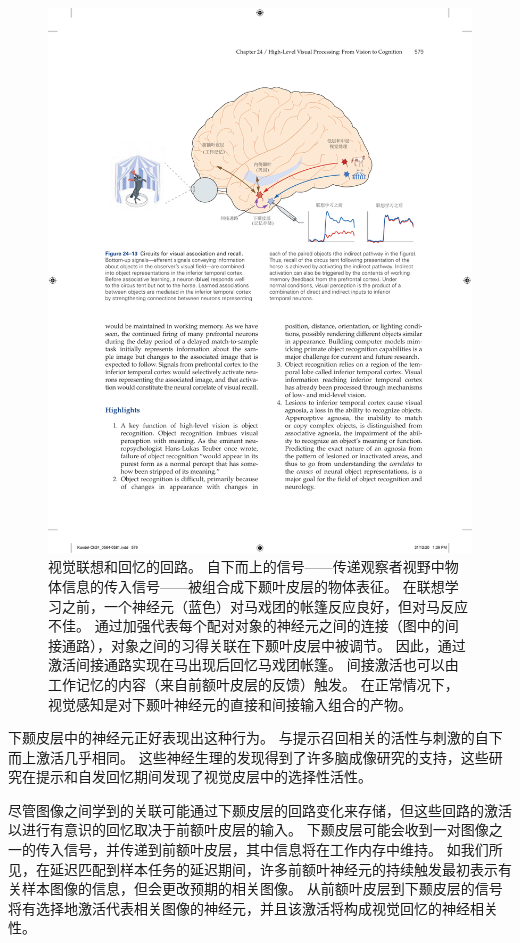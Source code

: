 \begin{figure}[htbp]
	\centering
	\includegraphics[width=1.0\linewidth]{chap24/fig_24_13}
	\caption{视觉联想和回忆的回路。
		自下而上的信号——传递观察者视野中物体信息的传入信号——被组合成下颞叶皮层的物体表征。
		在联想学习之前，一个神经元（蓝色）对马戏团的帐篷反应良好，但对马反应不佳。
		通过加强代表每个配对对象的神经元之间的连接（图中的间接通路），对象之间的习得关联在下颞叶皮层中被调节。
		因此，通过激活间接通路实现在马出现后回忆马戏团帐篷。
		间接激活也可以由工作记忆的内容（来自前额叶皮层的反馈）触发。
		在正常情况下，视觉感知是对下颞叶神经元的直接和间接输入组合的产物。}
	\label{fig:24_13}
\end{figure}


下颞皮层中的神经元正好表现出这种行为。
与提示召回相关的活性与刺激的自下而上激活几乎相同。 
这些神经生理的发现得到了许多脑成像研究的支持，这些研究在提示和自发回忆期间发现了视觉皮层中的选择性活性。


尽管图像之间学到的关联可能通过下颞皮层的回路变化来存储，但这些回路的激活以进行有意识的回忆取决于前额叶皮层的输入。
下颞皮层可能会收到一对图像之一的传入信号，并传递到前额叶皮层，其中信息将在工作内存中维持。
如我们所见，在延迟匹配到样本任务的延迟期间，许多前额叶神经元的持续触发最初表示有关样本图像的信息，但会更改预期的相关图像。
从前额叶皮层到下颞皮层的信号将有选择地激活代表相关图像的神经元，并且该激活将构成视觉回忆的神经相关性。



